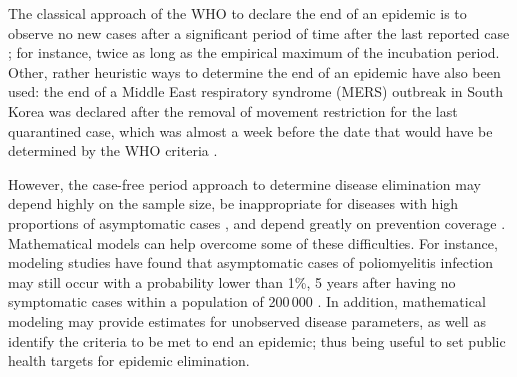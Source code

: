 The classical approach of the WHO to declare the end of an epidemic is to observe no new cases after a significant period of time after the last reported case \cite[]{Nishiura2016}; for instance, twice as long as the empirical maximum of the incubation period. Other, rather heuristic ways to determine the end of an epidemic have also been used: the end of a Middle East respiratory syndrome (MERS) outbreak in South Korea was declared after the removal of movement restriction for the last quarantined case, which was almost a week before the date that would have be determined by the WHO criteria \cite[]{Nishiura2016}. 

However, the case-free period approach to determine disease elimination may depend highly on the sample size, be inappropriate for diseases with high proportions of asymptomatic cases \cite[]{Nishiura2016}, and depend greatly on prevention coverage \cite[]{Eichner1996}. Mathematical models can help overcome some of these difficulties. For instance, modeling studies have found that asymptomatic cases of poliomyelitis infection may still occur with a probability lower than 1\%, 5 years after having no symptomatic cases within a population of 200\,000 \cite[]{Eichner1996}. In addition, mathematical modeling may provide estimates for unobserved disease parameters, as well as identify the criteria to be met to end an epidemic; thus being useful to set public health targets for epidemic elimination.

